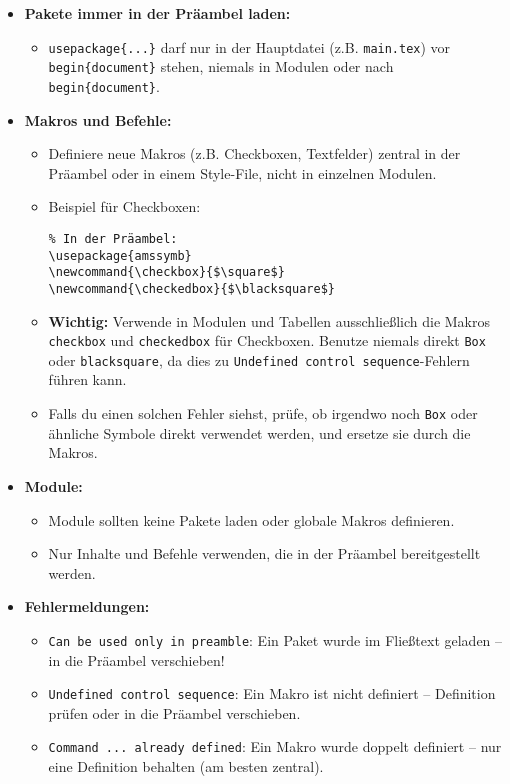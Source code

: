 \begin{itemize}
\tightlist
\item
  \textbf{Pakete immer in der Präambel laden:}

  \begin{itemize}
  \tightlist
  \item
    \texttt{usepackage\{...\}} darf nur in der Hauptdatei (z.B. \texttt{main.tex}) vor \texttt{begin\{document\}} stehen, niemals in Modulen oder nach \texttt{begin\{document\}}.
  \end{itemize}
\item
  \textbf{Makros und Befehle:}

  \begin{itemize}
  \item
    Definiere neue Makros (z.B. Checkboxen, Textfelder) zentral in der Präambel oder in einem Style-File, nicht in einzelnen Modulen.
  \item
    Beispiel für Checkboxen:

\begin{verbatim}
% In der Präambel:
\usepackage{amssymb}
\newcommand{\checkbox}{$\square$}
\newcommand{\checkedbox}{$\blacksquare$}
\end{verbatim}
  \item
    \textbf{Wichtig:} Verwende in Modulen und Tabellen ausschließlich die Makros \texttt{checkbox} und \texttt{checkedbox} für Checkboxen. Benutze niemals direkt \texttt{Box} oder \texttt{blacksquare}, da dies zu \texttt{Undefined\ control\ sequence}-Fehlern führen kann.
  \item
    Falls du einen solchen Fehler siehst, prüfe, ob irgendwo noch \texttt{Box} oder ähnliche Symbole direkt verwendet werden, und ersetze sie durch die Makros.
  \end{itemize}
\item
  \textbf{Module:}

  \begin{itemize}
  \tightlist
  \item
    Module sollten keine Pakete laden oder globale Makros definieren.
  \item
    Nur Inhalte und Befehle verwenden, die in der Präambel bereitgestellt werden.
  \end{itemize}
\item
  \textbf{Fehlermeldungen:}

  \begin{itemize}
  \tightlist
  \item
    \texttt{Can\ be\ used\ only\ in\ preamble}: Ein Paket wurde im Fließtext geladen -- in die Präambel verschieben!
  \item
    \texttt{Undefined\ control\ sequence}: Ein Makro ist nicht definiert -- Definition prüfen oder in die Präambel verschieben.
  \item
    \texttt{Command\ ...\ already\ defined}: Ein Makro wurde doppelt definiert -- nur eine Definition behalten (am besten zentral).
  \end{itemize}
\end{itemize}

